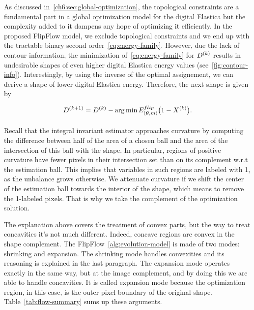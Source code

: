 As discussed in~\cref{ch6:sec:global-optimization}, the topological constraints are a fundamental part in a global optimization model for the digital Elastica but the complexity added to it dampens any hope of optimizing it efficiently. In the proposed FlipFlow model, we exclude topological constraints and we end up with the tractable binary second order~\cref{eq:energy-family}. However, due the lack of contour information, the minimization of~\cref{eq:energy-family} for $D^{(k)}$ results in undesirable shapes of even higher digital Elastica energy values  (see~\cref{fig:contour-info}). Interestingly, by using the inverse of the optimal assignement, we can derive a shape of lower digital Elastica energy. Therefore, the next shape is given by

\begin{align*}
	D^{(k+1)} = D^{(k)} - \operatorname*{arg\,min} _{}{E_{(\bm{\theta},m)}^{flip}\big(1-X^{(k)}} \big).
\end{align*}

Recall that the integral invariant estimator approaches curvature by computing the difference between half of the area
of a chosen ball and the area of the intersection of this ball with the shape.  In particular, regions of positive
curvature have fewer pixels in their intersection set than on its complement w.r.t the estimation ball. This implies
that variables in such regions are labeled with 1, as the unbalance grows otherwise. We attenuate curvature if we shift
the center of the estimation ball towards the interior of the shape, which means to remove the 1-labeled pixels. That is
why we take the complement of the optimization solution.


The explanation above covers the treatment of convex parts, but the way to treat concavities it's not much different. Indeed, concave regions are convex in the shape complement. The FlipFlow~\cref{alg:evolution-model} is made of two modes: shrinking and expansion. The shrinking mode handles convexities and its reasoning is explained in the last paragraph. The expansion mode operates exactly in the same way, but at the image complement, and by doing this we are able to handle
concavities. It is called expansion mode because the optimization region, in this case, is the outer pixel boundary of
the original shape. Table~\cref{tab:flow-summary} sums up these arguments.

%
	
